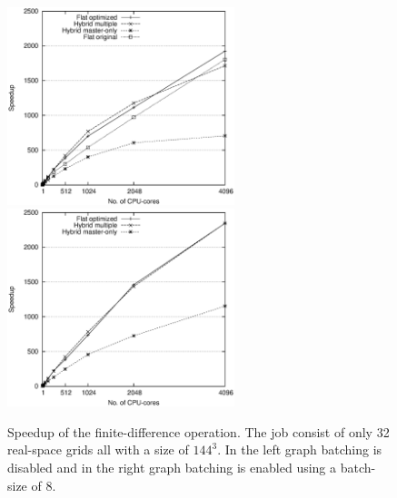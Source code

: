 \documentclass[preprint,3p,times,twocolumn]{elsarticle}
\begin{document}
\begin{figure}
\centerline{
\mbox{\includegraphics[width=250px]{gfx/fidi_speedup}}
\mbox{\includegraphics[width=250px]{gfx/fidi_batchspeedup}}
} 
 \caption{Speedup of the finite-difference operation. The job consist of only 32 real-space grids all with a size of $144^3$. In the left graph batching is disabled and in the right graph batching is enabled using a batch-size of 8.}
 \label{fig:speedup}
\end{figure}
\end{document}
